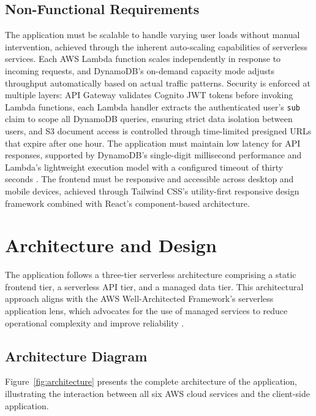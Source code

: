 \documentclass[conference]{IEEEtran}
\begin{document}
\subsection{Non-Functional Requirements}

The application must be scalable to handle varying user loads without manual intervention, achieved through the inherent auto-scaling capabilities of serverless services. Each AWS Lambda function scales independently in response to incoming requests, and DynamoDB's on-demand capacity mode adjusts throughput automatically based on actual traffic patterns. Security is enforced at multiple layers: API Gateway validates Cognito JWT tokens before invoking Lambda functions, each Lambda handler extracts the authenticated user's \texttt{sub} claim to scope all DynamoDB queries, ensuring strict data isolation between users, and S3 document access is controlled through time-limited presigned URLs that expire after one hour. The application must maintain low latency for API responses, supported by DynamoDB's single-digit millisecond performance and Lambda's lightweight execution model with a configured timeout of thirty seconds \cite{sbarski2017serverless}. The frontend must be responsive and accessible across desktop and mobile devices, achieved through Tailwind CSS's utility-first responsive design framework combined with React's component-based architecture.

\section{Architecture and Design}

The application follows a three-tier serverless architecture comprising a static frontend tier, a serverless API tier, and a managed data tier. This architectural approach aligns with the AWS Well-Architected Framework's serverless application lens, which advocates for the use of managed services to reduce operational complexity and improve reliability \cite{awswell2023}.

\subsection{Architecture Diagram}

Figure~\ref{fig:architecture} presents the complete architecture of the application, illustrating the interaction between all six AWS cloud services and the client-side application.
\end{document}
